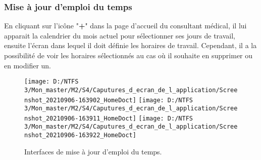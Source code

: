 \subsubsection{Mise à jour d'emploi du temps}
En cliquant sur l'icône "\textbf{+}" dans la page d'accueil du consultant médical, il lui apparait la calendrier du mois actuel pour sélectionner ses jours de travail, ensuite l'écran dans lequel il doit définie les horaires de travail. Cependant, il a la possibilité de voir les horaires sélectionnés au cas où il souhaite en supprimer ou en modifier un. 
\begin{figure}[h]
	\texttt{[image: D:/NTFS 3/Mon\_master/M2/S4/Caputures\_d\_ecran\_de\_l\_application/Screenshot\_20210906-163902\_HomeDoct]}
	\texttt{[image: D:/NTFS 3/Mon\_master/M2/S4/Caputures\_d\_ecran\_de\_l\_application/Screenshot\_20210906-163911\_HomeDoct]}
	\texttt{[image: D:/NTFS 3/Mon\_master/M2/S4/Caputures\_d\_ecran\_de\_l\_application/Screenshot\_20210906-163922\_HomeDoct]}
	\centering
	\caption{Interfaces de mise à jour d'emploi du temps.}
	\label{Figure 5.9}
\end{figure}